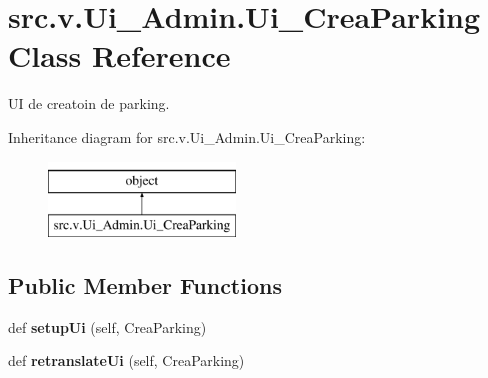 \hypertarget{classsrc_1_1v_1_1_ui___admin_1_1_ui___crea_parking}{}\section{src.\+v.\+Ui\+\_\+\+Admin.\+Ui\+\_\+\+Crea\+Parking Class Reference}
\label{classsrc_1_1v_1_1_ui___admin_1_1_ui___crea_parking}


U\+I de creatoin de parking.  


Inheritance diagram for src.\+v.\+Ui\+\_\+\+Admin.\+Ui\+\_\+\+Crea\+Parking\+:\begin{figure}[H]
\begin{center}
\leavevmode
\includegraphics[height=2.000000cm]{classsrc_1_1v_1_1_ui___admin_1_1_ui___crea_parking}
\end{center}
\end{figure}
\subsection*{Public Member Functions}
\begin{DoxyCompactItemize}
\item 
\hypertarget{classsrc_1_1v_1_1_ui___admin_1_1_ui___crea_parking_a5f20c95cd37cc2780e7407d3c31c8661}{}def {\bfseries setup\+Ui} (self, Crea\+Parking)\label{classsrc_1_1v_1_1_ui___admin_1_1_ui___crea_parking_a5f20c95cd37cc2780e7407d3c31c8661}

\item 
\hypertarget{classsrc_1_1v_1_1_ui___admin_1_1_ui___crea_parking_a5f1a81053c083d31ebfb85b85b2d1ffb}{}def {\bfseries retranslate\+Ui} (self, Crea\+Parking)\label{classsrc_1_1v_1_1_ui___admin_1_1_ui___crea_parking_a5f1a81053c083d31ebfb85b85b2d1ffb}

\end{DoxyCompactItemize}

